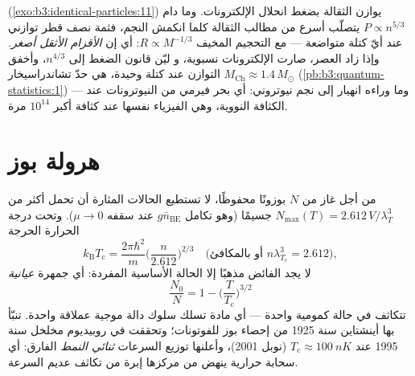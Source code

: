 \begin{example}\label{ex:b3:quantum-statistics:dwarf}
 (\cref{exo:b3:identical-particles:11}) يوازن
الثقالة بضغط انحلال الإلكترونات. وما دام $P \propto
n^{5/3}$ يتصلّب أسرع من مطالب الثقالة كلما انكمش
النجم، فثمة نصف قطر توازني عند أيّ كتلة متواضعة --- مع
التحجيم المخيف $R \propto M^{-1/3}$: أي إن \emph{الأقزام الأثقل
أصغر}. وإذا زاد العصر، صارت الإلكترونات نسبوية، و
ليّن قانون الضغط إلى $n^{4/3}$، وأخفق التوازن عند
كتلة وحيدة، هي حدّ تشاندراسيخار $M_{\text{Ch}} \approx
1.4\,M_\odot$ (\cref{pb:b3:quantum-statistics:1}) --- وما وراءه
انهيار إلى نجم نيوتروني: أي بحر فيرمي من النيوترونات عند الكثافة
النووية، وهي الفيزياء نفسها عند كثافة أكبر $10^{14}$ مرة.
\end{example}

\section{هرولة بوز}

\begin{theorem}\label{thm:b3:quantum-statistics:bec}
من أجل غاز من $N$ بوزونًا محفوظًا، لا تستطيع الحالات المثارة أن تحمل
أكثر من $N_{\max}(T) = 2.612\,V/\lambda_T^3$ جسيمًا (وهو تكامل
$g\bar n_{\text{BE}}$ عند سقفه $\mu \to 0$). وتحت درجة
الحرارة الحرجة
\[
k_{\text{B}}T_{\text{c}} = \frac{2\pi\hbar^2}{m}
\Big(\frac{n}{2.612}\Big)^{2/3}
\quad\text{(أو بالمكافئ } n\lambda_{T_{\text{c}}}^3 = 2.612
\text{)} ,
\]
لا يجد الفائض مذهبًا إلا الحالة الأساسية المفردة: أي جمهرة
\emph{عيانية}
\[
\frac{N_0}{N} = 1 - \Big(\frac{T}{T_{\text{c}}}\Big)^{3/2}
\]
تتكاثف في حالة كمومية واحدة --- أي مادة تسلك سلوك دالة موجية
عملاقة واحدة. تنبّأ بها أينشتاين سنة 1925 من إحصاء بوز
للفوتونات؛ وتحققت في روبيديوم مخلخل سنة 1995 عند
$T_{\text{c}} \approx \qty{100}{nK}$ (نوبل 2001)، وأعلنها
توزيع السرعات \emph{ثنائي النمط} الفارق: أي سحابة حرارية
ينهض من مركزها إبرة من تكاثف عديم السرعة.
\end{theorem}
\admitted

